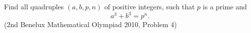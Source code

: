 Find all quadruples $(a, b, p, n)$ of positive integers, such that $p$ is a prime and\[a^3 + b^3 = p^n\mbox{.}\](2nd Benelux Mathematical Olympiad 2010, Problem 4)